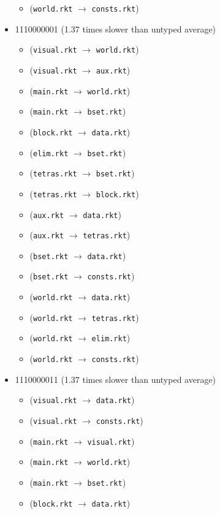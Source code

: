 \documentclass{article}
\newcommand{\mono}[1]{\texttt{#1}}
\begin{document}
\begin{itemize}
\begin{itemize}
  \item (\mono{world.rkt} $\rightarrow$ \mono{consts.rkt})
  \end{itemize}
\item 1110000001 (1.37 times slower than untyped average)
  \begin{itemize}
  \item (\mono{visual.rkt} $\rightarrow$ \mono{world.rkt})
  \item (\mono{visual.rkt} $\rightarrow$ \mono{aux.rkt})
  \item (\mono{main.rkt} $\rightarrow$ \mono{world.rkt})
  \item (\mono{main.rkt} $\rightarrow$ \mono{bset.rkt})
  \item (\mono{block.rkt} $\rightarrow$ \mono{data.rkt})
  \item (\mono{elim.rkt} $\rightarrow$ \mono{bset.rkt})
  \item (\mono{tetras.rkt} $\rightarrow$ \mono{bset.rkt})
  \item (\mono{tetras.rkt} $\rightarrow$ \mono{block.rkt})
  \item (\mono{aux.rkt} $\rightarrow$ \mono{data.rkt})
  \item (\mono{aux.rkt} $\rightarrow$ \mono{tetras.rkt})
  \item (\mono{bset.rkt} $\rightarrow$ \mono{data.rkt})
  \item (\mono{bset.rkt} $\rightarrow$ \mono{consts.rkt})
  \item (\mono{world.rkt} $\rightarrow$ \mono{data.rkt})
  \item (\mono{world.rkt} $\rightarrow$ \mono{tetras.rkt})
  \item (\mono{world.rkt} $\rightarrow$ \mono{elim.rkt})
  \item (\mono{world.rkt} $\rightarrow$ \mono{consts.rkt})
  \end{itemize}
\item 1110000011 (1.37 times slower than untyped average)
  \begin{itemize}
  \item (\mono{visual.rkt} $\rightarrow$ \mono{data.rkt})
  \item (\mono{visual.rkt} $\rightarrow$ \mono{consts.rkt})
  \item (\mono{main.rkt} $\rightarrow$ \mono{visual.rkt})
  \item (\mono{main.rkt} $\rightarrow$ \mono{world.rkt})
  \item (\mono{main.rkt} $\rightarrow$ \mono{bset.rkt})
  \item (\mono{block.rkt} $\rightarrow$ \mono{data.rkt})

\end{itemize}
\end{itemize}
\end{document}
